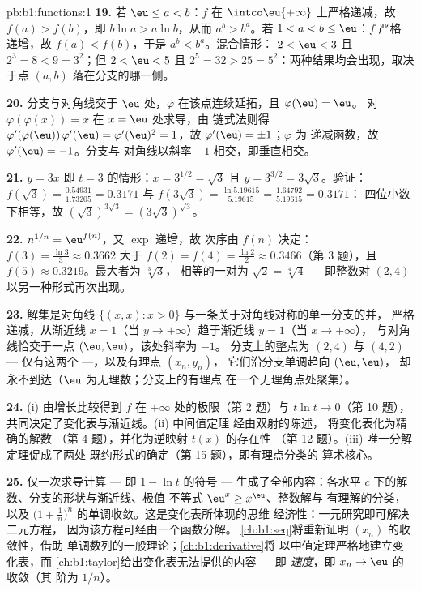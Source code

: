 \begin{solution}{pb:b1:functions:1}
\textbf{19.} 若 $\eu \leq a < b$：$f$ 在
$\intco\eu{+\infty}$ 上严格递减，故 $f(a) > f(b)$，即 $b\ln a > a\ln
b$，从而 $a^b > b^a$。若 $1 < a < b \leq \eu$：$f$ 严格
递增，故 $f(a) < f(b)$，于是 $a^b < b^a$。混合情形：
$2 < \eu < 3$ 且 $2^3 = 8 < 9 = 3^2$；但 $2 < \eu < 5$ 且
$2^5 = 32 > 25 = 5^2$：两种结果均会出现，取决于点
$(a, b)$ 落在分支的哪一侧。

\textbf{20.} 分支与对角线交于 $\eu$ 处，$\varphi$
在该点连续延拓，且 $\varphi(\eu) = \eu$。
对 $\varphi(\varphi(x)) = x$ 在 $x = \eu$ 处求导，由
链式法则得 $\varphi'(\varphi(\eu))\,\varphi'(\eu) =
\varphi'(\eu)^2 = 1$，故 $\varphi'(\eu) = \pm1$；$\varphi$ 为
递减函数，故 $\varphi'(\eu) = -1$。分支与
对角线以斜率 $-1$ 相交，即垂直相交。

\textbf{21.} $y = 3x$ 即 $t = 3$ 的情形：$x = 3^{1/2} = \sqrt3$
且 $y = 3^{3/2} = 3\sqrt3$。验证：$f(\sqrt3) =
\frac{0.54931}{1.73205} = 0.3171$ 与 $f(3\sqrt3) =
\frac{\ln 5.19615}{5.19615} = \frac{1.64792}{5.19615} = 0.3171$：
四位小数下相等，故 $(\sqrt3)^{3\sqrt3} =
(3\sqrt3)^{\sqrt3}$。

\textbf{22.} $n^{1/n} = \eu^{f(n)}$，又 $\exp$ 递增，故
次序由 $f(n)$ 决定：$f(3) = \frac{\ln3}3 \approx
0.3662$ 大于 $f(2) = f(4) = \frac{\ln2}2 \approx 0.3466$（第
3 题），且 $f(5) \approx 0.3219$。最大者为 $\sqrt[3]3$，
相等的一对为 $\sqrt2 = \sqrt[4]4$ --- 即整数对 $(2, 4)$
以另一种形式再次出现。

\textbf{23.} 解集是对角线 $\{(x,
x) : x > 0\}$ 与一条关于对角线对称的单一分支的并，
严格递减，从渐近线 $x = 1$（当 $y \to
+\infty$）趋于渐近线 $y = 1$（当 $x \to +\infty$），
与对角线恰交于一点 $(\eu, \eu)$，该处斜率为 $-1$。
分支上的整点为 $(2, 4)$ 与 $(4, 2)$
--- 仅有这两个 ---，以及有理点 $(x_n, y_n)$，
它们沿分支单调趋向 $(\eu, \eu)$，
却永不到达（$\eu$ 为无理数；分支上的有理点
在一个无理角点处聚集）。

\textbf{24.} (i) 由增长比较得到 $f$ 在
$+\infty$ 处的极限（第 2 题）与 $t\ln t \to 0$（第 10 题），
共同决定了变化表与渐近线。(ii) 中间值定理
经由双射的陈述，
将变化表化为精确的解数
（第 4 题），并化为逆映射 $t(x)$ 的存在性
（第 12 题）。(iii) 唯一分解定理促成了两处
既约形式的确定（第 15 题），即有理点分类的
算术核心。

\textbf{25.} 仅一次求导计算 --- 即 $1 - \ln
t$ 的符号 --- 生成了全部内容：各水平
$c$ 下的解数、分支的形状与渐近线、极值
不等式 $\eu^x \geq x^\eu$、整数解与
有理解的分类，以及 $\bigl(1 +
\frac1n\bigr)^n$ 的单调收敛。这是变化表所体现的思维
经济性：一元研究即可解决二元方程，
因为该方程可经由一个函数分解。
\cref{ch:b1:seq}将重新证明 $(x_n)$ 的收敛性，借助
单调数列的一般理论；\cref{ch:b1:derivative}将
以中值定理严格地建立变化表，而
\cref{ch:b1:taylor}给出变化表无法提供的内容 --- 即
\emph{速度}，即 $x_n \to \eu$ 的收敛（其
阶为 $1/n$）。
\end{solution}
